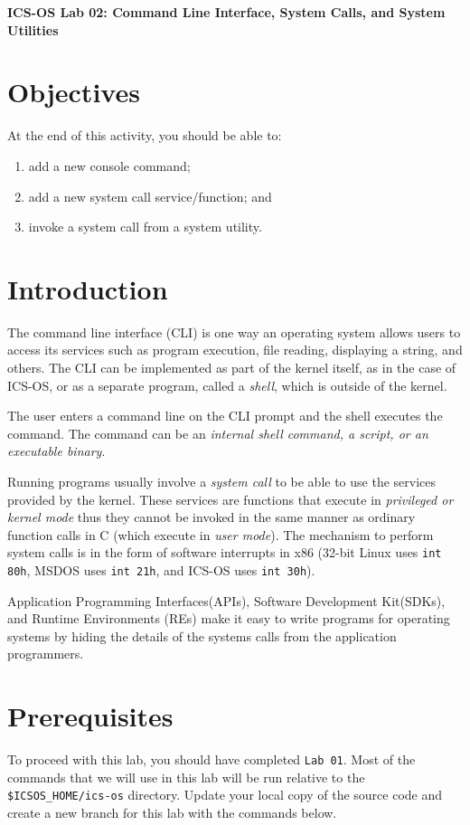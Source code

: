 \documentclass[a4paper, 11pt,oneside]{article}
\begin{document}
\begin{center}
   {\LARGE \textbf{ICS-OS Lab 02: Command Line Interface, System Calls, and System
Utilities }}
\end{center}

\section*{Objectives}
   At the end of this activity, you should be able to:
   \begin{enumerate}[itemsep=0pt,parsep=0pt]
       \item add a new console command;
       \item add a new system call service/function; and
       \item invoke a system call from a system utility.
   \end{enumerate}   

\section{Introduction}
The command line interface (CLI) is one way an operating system allows users to 
access its services such as program execution, file reading, displaying a 
string, and others. The CLI can be implemented as part of the kernel itself, as 
in the case of ICS-OS, or as a separate program, called a \textit{shell}, which 
is outside of the kernel. 

The user enters a command line on the CLI prompt and the shell executes the 
command. The command can be an \textit{internal shell command, a script, or an 
executable binary}. 

Running programs usually involve a \textit{system call} to be able to use the  
services provided by the kernel. These services are functions that execute in 
\textit{privileged or kernel mode} thus they cannot be invoked in the same 
manner as ordinary function calls in C (which execute in \textit{user mode}). 
The mechanism to perform system calls is in the form of software interrupts in 
x86 (32-bit Linux uses \texttt{int 80h}, MSDOS uses \texttt{int 21h}, and 
ICS-OS uses \texttt{int 30h}). 

Application Programming Interfaces(APIs), Software Development Kit(SDKs), and 
Runtime Environments (REs) make it easy to write programs for operating systems 
by hiding the details of the systems calls from the application programmers.


\section{Prerequisites}
To proceed with this lab, you should have completed \texttt{Lab 01}. Most of 
the commands that we will use in this lab will be run relative to the 
\texttt{\$ICSOS\_HOME/ics-os} directory. Update your local copy of the source 
code and create a new branch for this lab with the commands below.
\end{document}
